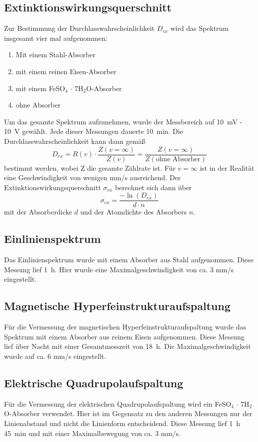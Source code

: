 \documentclass[12pt,a4paper]{article}
\begin{document}
\subsection{Extinktionswirkungsquerschnitt}
Zur Bestimmung der Durchlasswahrscheinlichkeit $D_{ex}$ wird das Spektrum insgesamt vier mal aufgenommen:
\begin{enumerate}
\item Mit einem Stahl-Absorber
\item mit einem reinen Eisen-Absorber
\item mit einem FeSO$_4$ $\cdot$ 7H$_2$O-Absorber
\item ohne Absorber 
\end{enumerate} 
Um das gesamte Spektrum aufzunehmen, wurde der Messbereich auf \SI{10}{mV} - \SI{10}{V} gewählt. Jede dieser Messungen dauerte \SI{10}{min}. Die Durchlasswahrscheinlichkeit kann dann gemäß
\begin{equation*}
D_{ex} = R(v) \cdot \dfrac{Z(v = \infty)}{Z(v)} = \dfrac{Z(v = \infty)}{Z(\textrm{ohne Absorber})}
\end{equation*}
bestimmt werden, wobei Z die gesamte Zählrate ist. Für $v = \infty$ ist in der Realität eine Geschwindigkeit von wenigen mm/s ausreichend. Der Extinktionswirkungsquerschnitt $\sigma _{ex}$ berechnet sich dann über
\begin{equation*}
\sigma _{ex} = \dfrac{- \ln(D_{ex})}{d \cdot n}
\end{equation*}
mit der Absorberdicke $d$ und der Atomdichte des Absorbers $n$.

\subsection{Einlinienspektrum}
Das Einlinienspektrum wurde mit einem Absorber aus Stahl aufgenommen. Diese Messung lief \SI{1}{h}. Hier wurde eine Maximalgeschwindigkeit von ca. 3 mm/s eingestellt.

\subsection{Magnetische Hyperfeinstrukturaufspaltung}
Für die Vermessung der magnetischen Hyperfeinstrukturaufspaltung wurde das Spektrum mit einem Absorber aus reinem Eisen aufgenommen. Diese Messung lief über Nacht mit einer Gesamtmesszeit von \SI{18}{h}. Die Maximalgeschwindigkeit wurde auf ca. 6 mm/s eingestellt.


\subsection{Elektrische Quadrupolaufspaltung}
Für die Vermessung der elektrischen Quadrupolaufspaltung wird ein FeSO$_4$ $\cdot$ 7H$_2$O-Absorber verwendet. Hier ist im Gegensatz zu den anderen Messungen nur der Linienabstand und nicht die Linienform entscheidend. Diese Messung lief \SI{1}{h} \SI{45}{min} und mit einer Maximalbewegung von ca. 3 mm/s.
\newpage
\end{document}
